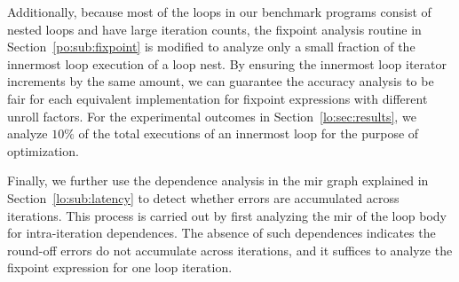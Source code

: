 Additionally, because most of the loops in our benchmark programs consist
of nested loops and have large iteration counts, the fixpoint analysis
routine in Section~\ref{po:sub:fixpoint} is modified to analyze only a small
fraction of the innermost loop execution of a loop nest.  By ensuring the
innermost loop iterator increments by the same amount, we can guarantee the
accuracy analysis to be fair for each equivalent implementation for fixpoint
expressions with different unroll factors.  For the experimental outcomes in
Section~\ref{lo:sec:results}, we analyze $10\%$ of the total executions of an
innermost loop for the purpose of optimization.

Finally, we further use the dependence analysis in the \gls{mir} graph
explained in Section~\ref{lo:sub:latency} to detect whether errors are
accumulated across iterations.  This process is carried out by first analyzing
the \gls{mir} of the loop body for intra-iteration dependences.  The absence
of such dependences indicates the round-off errors do not accumulate across
iterations, and it suffices to analyze the fixpoint expression for one loop
iteration.
